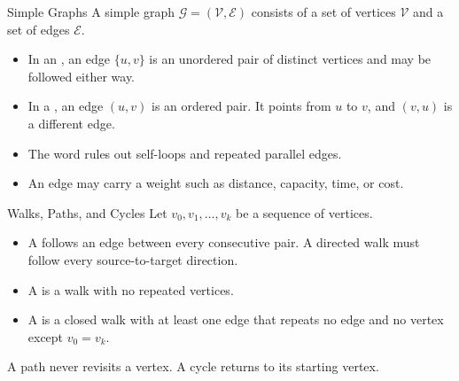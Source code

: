 \documentclass[aspectratio=169,11pt]{beamer}
\begin{document}
\begin{frame}{Simple Graphs}
  A simple graph $\mathcal G=(\mathcal V,\mathcal E)$ consists of a set of vertices
  $\mathcal V$ and a set of edges $\mathcal E$.

  \vspace{0.8em}
  \begin{itemize}\setlength{\itemsep}{0.8em}
    \item In an , an edge $\{u,v\}$ is an unordered
      pair of distinct vertices and may be followed either way.
    \item In a , an edge $(u,v)$ is an ordered pair.
      It points from $u$ to $v$, and $(v,u)$ is a different edge.
    \item The word  rules out self-loops and repeated parallel edges.
    \item An edge may carry a weight such as distance, capacity, time, or cost.
  \end{itemize}

\end{frame}

\begin{frame}{Walks, Paths, and Cycles}
  Let $v_0,v_1,\ldots,v_k$ be a sequence of vertices.

  \vspace{0.8em}
  \begin{itemize}\setlength{\itemsep}{0.85em}
    \item A  follows an edge between every consecutive pair. A
      directed walk must follow every source-to-target direction.
    \item A  is a walk with no repeated vertices.
    \item A  is a closed walk with at least one edge that repeats
      no edge and no vertex except $v_0=v_k$.
  \end{itemize}

  \vspace{0.5em}
  A path never revisits a vertex. A cycle returns to its starting vertex.
\end{frame}
\end{document}
